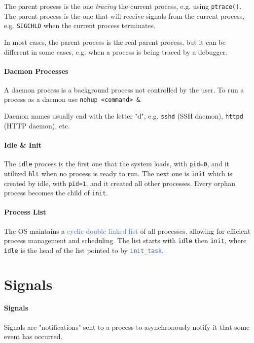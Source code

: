 \documentclass[openany,12pt]{book}
\newcommand{\code}[1]{\texttt{#1}}
\newcommand{\blue}[1]{\textcolor{RoyalBlue}{#1}}
\begin{document}
The parent process is the one \textit{tracing} the current process, e.g. using \code{ptrace()}. The parent process is the one that will receive signals from the current process, e.g. \texttt{SIGCHLD} when the current process terminates.

In most cases, the parent process is the real parent process, but it can be different in some cases, e.g. when a process is being traced by a debugger.



\paragraph{Daemon Processes}
A daemon process is a background process not controlled by the user.
To run a process as a daemon use \code{nohup <command> \&}.

Daemon names usually end with the letter "d", e.g. \texttt{sshd} (SSH daemon), \texttt{httpd} (HTTP daemon), etc.


\paragraph{Idle \& Init} The \code{idle} process is the first one that the system loads, with \code{pid=0}, and it utilized \code{hlt} when no process is ready to run. The next one is \code{init} which is created by idle, with \code{pid=1}, and it created all other processes. Every orphan process becomes the child of \code{init}.

\paragraph{Process List} The OS maintains a \blue{cyclic double linked list} of all processes, allowing for efficient process management and scheduling. The list starts with \code{idle} then \code{init}, where \code{idle} is the head of the list pointed to by \blue{\code{init\_task}}.


\newpage
\section*{Signals}
\paragraph{Signals}
Signals are "notifications" sent to a process to asynchronously notify it that some event has occurred.
\end{document}
